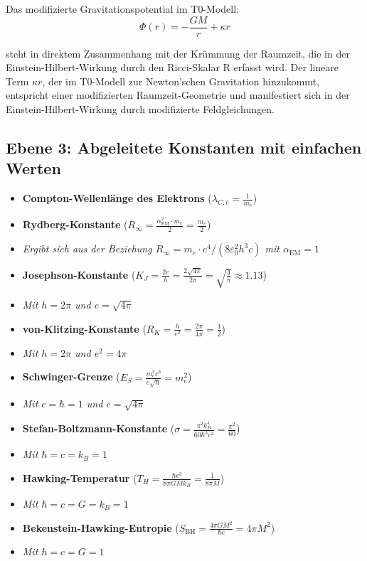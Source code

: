 \documentclass[12pt,a4paper]{article}
\newcommand{\alphaEM}{\alpha_{\text{EM}}}
\begin{document}
	Das modifizierte Gravitationspotential im T0-Modell:
	\[
	\Phi(r) = -\frac{GM}{r} + \kappa r
	\]
	
	steht in direktem Zusammenhang mit der Krümmung der Raumzeit, die in der Einstein-Hilbert-Wirkung durch den Ricci-Skalar R erfasst wird. Der lineare Term $\kappa r$, der im T0-Modell zur Newton'schen Gravitation hinzukommt, entspricht einer modifizierten Raumzeit-Geometrie und manifestiert sich in der Einstein-Hilbert-Wirkung durch modifizierte Feldgleichungen.
	
	\subsection*{Ebene 3: Abgeleitete Konstanten mit einfachen Werten}
	\begin{itemize}[itemsep=0.5em]
		\item \textbf{Compton-Wellenlänge des Elektrons} (\(\lambda_{C,e} = \frac{1}{m_e}\))
		\item \textbf{Rydberg-Konstante} (\(R_\infty = \frac{\alphaEM^2 \cdot m_e}{2} = \frac{m_e}{2}\))
		\item[] \textit{Ergibt sich aus der Beziehung $R_\infty = m_e\cdot e^4/(8\varepsilon_0^2h^3c)$ mit $\alphaEM = 1$}
		\item \textbf{Josephson-Konstante} (\(K_J = \frac{2e}{h} = \frac{2\sqrt{4\pi}}{2\pi} = \sqrt{\frac{4}{\pi}} \approx 1.13\))
		\item[] \textit{Mit $h = 2\pi$ und $e = \sqrt{4\pi}$}
		\item \textbf{von-Klitzing-Konstante} (\(R_K = \frac{h}{e^2} = \frac{2\pi}{4\pi} = \frac{1}{2}\))
		\item[] \textit{Mit $h = 2\pi$ und $e^2 = 4\pi$}
		\item \textbf{Schwinger-Grenze} (\(E_S = \frac{m_e^2c^3}{e\sqrt{\hbar}} = m_e^2\))
		\item[] \textit{Mit $c = \hbar = 1$ und $e = \sqrt{4\pi}$}
		\item \textbf{Stefan-Boltzmann-Konstante} (\(\sigma = \frac{\pi^2k_B^4}{60\hbar^3c^2} = \frac{\pi^2}{60}\))
		\item[] \textit{Mit $\hbar = c = k_B = 1$}
		\item \textbf{Hawking-Temperatur} (\(T_H = \frac{\hbar c^3}{8\pi GMk_B} = \frac{1}{8\pi M}\))
		\item[] \textit{Mit $\hbar = c = G = k_B = 1$}
		\item \textbf{Bekenstein-Hawking-Entropie} (\(S_{\mathrm{BH}} = \frac{4\pi GM^2}{\hbar c} = 4\pi M^2\))
		\item[] \textit{Mit $\hbar = c = G = 1$}
	\end{itemize}
	
\end{document}
